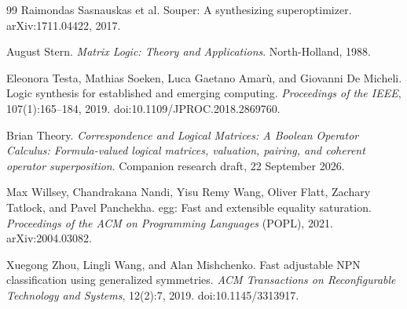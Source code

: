 \documentclass[10pt]{article}
\theoremstyle{plain}
\theoremstyle{definition}
\theoremstyle{remark}
\begin{document}
\begin{thebibliography}{99}
Raimondas Sasnauskas et al.
\newblock Souper: A synthesizing superoptimizer.
\newblock arXiv:1711.04422, 2017.

August Stern.
\newblock \emph{Matrix Logic: Theory and Applications}.
\newblock North-Holland, 1988.

Eleonora Testa, Mathias Soeken, Luca Gaetano Amar\`u, and Giovanni De Micheli.
\newblock Logic synthesis for established and emerging computing.
\newblock \emph{Proceedings of the IEEE}, 107(1):165--184, 2019.
\newblock doi:10.1109/JPROC.2018.2869760.

Brian Theory.
\newblock \emph{Correspondence and Logical Matrices: A Boolean Operator Calculus: Formula-valued logical matrices, valuation, pairing, and coherent operator superposition}.
\newblock Companion research draft, 22 September 2026.

Max Willsey, Chandrakana Nandi, Yisu Remy Wang, Oliver Flatt, Zachary Tatlock, and Pavel Panchekha.
\newblock egg: Fast and extensible equality saturation.
\newblock \emph{Proceedings of the ACM on Programming Languages} (POPL), 2021.
\newblock arXiv:2004.03082.

Xuegong Zhou, Lingli Wang, and Alan Mishchenko.
\newblock Fast adjustable NPN classification using generalized symmetries.
\newblock \emph{ACM Transactions on Reconfigurable Technology and Systems}, 12(2):7, 2019.
\newblock doi:10.1145/3313917.

\end{thebibliography}
\end{document}

